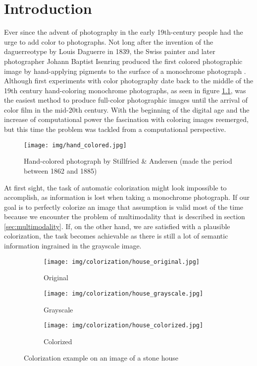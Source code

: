\chapter{Introduction}
\label{ch:introduction}

Ever since the advent of photography in the early 19th-century people had
the urge to add color to photographs. Not long after the invention of the 
daguerreotype by Louis Daguerre in 1839, the Swiss painter and later photographer 
Johann Baptist Isenring produced the first colored photographic image by 
hand-applying pigments to the surface of a monochrome photograph \citep{henisch1996photograph}. 
Although first experiments with color photography date back to the middle of the 19th 
century hand-coloring monochrome photographs, as seen in figure \ref{fig:hand_colored}, 
was the easiest method to produce full-color photographic images until the arrival 
of color film in the mid-20th century. With the beginning of the digital age and 
the increase of computational power the fascination with coloring images reemerged, 
but this time the problem was tackled from a computational perspective.

\begin{figure}[H]
    \centering
    \texttt{[image: img/hand\_colored.jpg]}
    \caption{Hand-colored photograph by Stillfried \& Andersen (made the period between 1862 and 1885)}
    \label{fig:hand_colored}
\end{figure}

At first sight, the task of automatic colorization might look impossible to accomplish, 
as information is lost when taking a monochrome photograph. If our goal is to 
perfectly colorize an image that assumption is valid most of the time because we 
encounter the problem of multimodality that is described in section 
\ref{sec:multimodality}. If, on the other hand, we are satisfied with a plausible 
colorization, the task becomes achievable as there is still a lot of semantic 
information ingrained in the grayscale image. 

\begin{figure}[ht!]
	\centering
	\begin{subfigure}{.32\textwidth}
		\centering
		\texttt{[image: img/colorization/house\_original.jpg]}
        \caption{Original}
		\label{fig:stone_house:original}
	\end{subfigure}
    \begin{subfigure}{.32\textwidth}
		\centering
		\texttt{[image: img/colorization/house\_grayscale.jpg]}
        \caption{Grayscale}
        \label{fig:stone_house:grayscale}
    \end{subfigure}
	\begin{subfigure}{.32\textwidth}
		\centering
		\texttt{[image: img/colorization/house\_colorized.jpg]}
        \caption{Colorized}
        \label{fig:stone_house:colorized}
    \end{subfigure}
    \caption{Colorization example on an image of a stone house}
	\label{fig:stone_house}
\end{figure}

